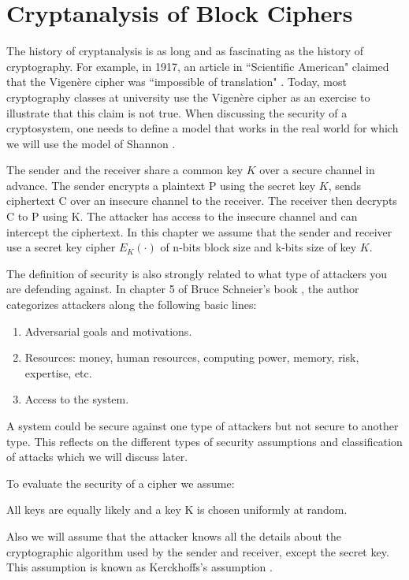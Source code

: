 \chapter{Cryptanalysis of Block Ciphers} \label{ch:CoBC}
\label{Cryptanalysis of block ciphers}
%
The history of cryptanalysis is as long and as fascinating as the history of cryptography. For example, in 1917, an article in ``Scientific American" claimed that the Vigen\`{e}re cipher was ``impossible of translation" \cite{knudsen1998block}. Today, most cryptography classes at university use the Vigen\`{e}re cipher as an exercise to illustrate that this claim is not true. When discussing the security of a cryptosystem, one needs to define a model that works in the real world for which we will use the model of Shannon \cite{shannon1949communication}.


The sender and the receiver share a common key $K$ over a secure channel in advance. The sender encrypts a plaintext P using the secret key $K$, sends ciphertext C over an insecure channel to the receiver. The receiver then decrypts C to P using K. The attacker has access to the insecure channel and can intercept the ciphertext. In this chapter we assume that the sender and receiver use a secret key cipher $E_{K}(\cdot)$ of n-bits block size and k-bits size of key $K$. 

The definition of security is also strongly related to what type of attackers you are defending against. In chapter 5 of Bruce Schneier's book \cite{schneier2006beyond}, the author categorizes attackers along the following basic lines: 
	
\begin{enumerate}
	\item Adversarial goals and motivations.
	\item Resources: money, human resources, computing power, memory, risk, expertise, etc.
	\item Access to the system.
\end{enumerate}

A system could be secure against one type of attackers but not secure to another type. This reflects on the different types of security assumptions and classification of attacks which we will discuss later. 

To evaluate the security of a cipher we assume:

\begin{myAssumption}
	All keys are equally likely and a key K is chosen uniformly at random.
\end{myAssumption}
Also we will assume that the attacker knows all the details about the cryptographic algorithm used by the sender and receiver, except the secret key. This assumption is known as Kerckhoffs's assumption \cite{kahn1996codebreakers}.



